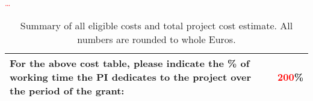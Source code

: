 \documentclass[B2]{ercgrant}
\begin{document}
\textcolor{red}{\blindtext[2]}

\textcolor{red}{\ldots}


\begin{table}[h]
    \begin{center}

        \setlength{\arrayrulewidth}{1.35pt}
        \def\arraystretch{1.5}
        \begin{tabular}{|p{0.634\hsize}|C{0.108\hsize}|}
            \hline
            \textbf{For the above cost table, please indicate the \% of working time
                the PI dedicates to the project over the period of the grant:}
             & \textbf{\textcolor{red}{200}\%} \\
            \hline
        \end{tabular}
        \caption{Summary of all eligible costs and total project cost estimate. All numbers are rounded to
            whole Euros.}
        \label{tab:budget}
    \end{center}
\end{table}



\nocite{*} %

\renewcommand\bibsection{\section*{\refname}}


\end{document}

